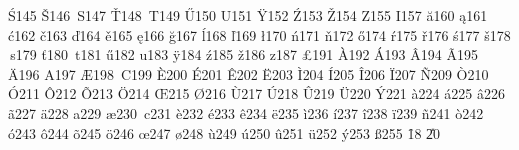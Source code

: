 \fCmpSym\'S{145}
\fCmpSym\v S{146}
\fCmpSym\,S{147}
\fCmpSym\v T{148}
\fCmpSym\,T{149}
\fCmpSym\H U{150}
\fCmpSym\ringaccent U{151}
\fCmpSym\"Y{152}
\fCmpSym\'Z{153}
\fCmpSym\v Z{154}
\fCmpSym\dotaccent Z{155}
\fSym{}
\fCmpSym\dotaccent I{157}
\fSym{}%
\fSym{}
\fCmpSym\u a{160}
\fCmpSym\k a{161}
\fCmpSym\'c{162}
\fCmpSym\v c{163}
\fCmpSym\v d{164}
\fCmpSym\v e{165}
\fCmpSym\k e{166}
\fCmpSym\u g{167}
\fCmpSym\'l{168}
\fCmpSym\v l{169}
\fSym\l{170}
\fCmpSym\'n{171}
\fCmpSym\v n{172}
\fSym{}
\fCmpSym\H o{174}
\fCmpSym\'r{175}
\fCmpSym\v r{176}
\fCmpSym\'s{177}
\fCmpSym\v s{178}
\fCmpSym\,s{179}
\fCmpSym\v t{180}
\fCmpSym\,t{181}
\fCmpSym\H u{182}
\fCmpSym\ringaccent u{183}
\fCmpSym\"y{184}
\fCmpSym\'z{185}
\fCmpSym\v z{186}
\fCmpSym\dotaccent z{187}
\fSym{}
\fSym{}
\fSym{}
\fSym\pounds{191}
\fCmpSym\`A{192}
\fCmpSym\'A{193}
\fCmpSym\^A{194}
\fCmpSym\~A{195}
\fCmpSym\"A{196}
\fCmpSym\ringaccent A{197}
\fSym\AE{198}
\fCmpSym\,C{199}
\fCmpSym\`E{200}
\fCmpSym\'E{201}
\fCmpSym\^E{202}
\fCmpSym\"E{203}
\fCmpSym\`I{204}
\fCmpSym\'I{205}
\fCmpSym\^I{206}
\fCmpSym\"I{207}
\fSym{}%
\fSym{}%
\fCmpSym\~N{209}
\fCmpSym\`O{210}
\fCmpSym\'O{211}
\fCmpSym\^O{212}
\fCmpSym\~O{213}
\fCmpSym\"O{214}
\fSym\OE{215}
\fSym\O{216}
\fCmpSym\`U{217}
\fCmpSym\'U{218}
\fCmpSym\^U{219}
\fCmpSym\"U{220}
\fCmpSym\'Y{221}
\fSym{}%
\fSym{}
\fCmpSym\`a{224}
\fCmpSym\'a{225}
\fCmpSym\^a{226}
\fCmpSym\~a{227}
\fCmpSym\"a{228}
\fCmpSym\ringaccent a{229}
\fSym\ae{230}
\fCmpSym\,c{231}
\fCmpSym\`e{232}
\fCmpSym\'e{233}
\fCmpSym\^e{234}
\fCmpSym\"e{235}
\fCmpSym\`i{236}
\fCmpSym\'i{237}
\fCmpSym\^i{238}
\fCmpSym\"i{239}
\fSym{}%
\fCmpSym\~n{241}
\fCmpSym\`o{242}
\fCmpSym\'o{243}
\fCmpSym\^o{244}
\fCmpSym\~o{245}
\fCmpSym\"o{246}
\fSym\oe{247}
\fSym\o{248}
\fCmpSym\`u{249}
\fCmpSym\'u{250}
\fCmpSym\^u{251}
\fCmpSym\"u{252}
\fCmpSym\'y{253}
\fSym{}%
\fSym\ss{255}
%
\t@oenc@common %
\fSym{}
\fAcc\f{18}
\fAcc{}
\fAcc\U{20}
\fSym{}
\fSym{}
\fSym{}%
\fSym{}%
\fSym{}%
\fSym{}
\fSym{}
\fSym{}
\fSym{}
\fSym{}
\fSym{}
\fSym{}
